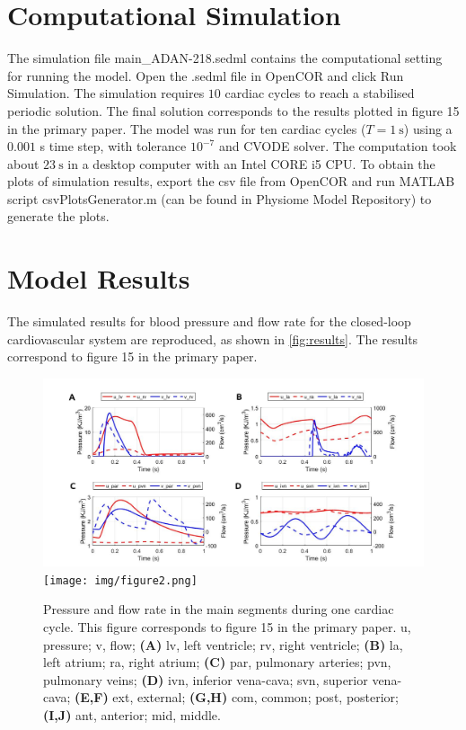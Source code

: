 \documentclass[fleqn,10pt]{physiome}
\begin{document}
\section{Computational Simulation} 

The simulation file main\_ADAN-218.sedml contains the computational setting for running the model. Open the .sedml file in OpenCOR and click Run Simulation. The simulation requires $10$ cardiac cycles to reach a stabilised periodic solution. The final solution corresponds to the results plotted in figure 15 in the primary paper. The model was run for ten cardiac cycles ($T = 1~\mathrm{s}$) using a $0.001$ s time step, with tolerance $10^{-7}$ and CVODE solver. The computation took about $23~\mathrm{s}$ in a desktop computer with an Intel CORE i5 CPU. To obtain the plots of simulation results, export the csv file from OpenCOR and run MATLAB script csvPlotsGenerator.m (can be found in Physiome Model Repository) to generate the plots.

\section{Model Results}
The simulated results for blood pressure and flow rate for the closed-loop cardiovascular system are reproduced, as shown in \autoref{fig:results}. The results correspond to figure 15 in the primary paper.

\begin{figure}[ht!]
    \includegraphics[scale=1.45]{img/figure1.png}
    \texttt{[image: img/figure2.png]}
    \caption{Pressure and flow rate in the main segments during one cardiac cycle. This figure corresponds to figure 15 in the primary paper. u, pressure; v, flow; \textbf{(A)} lv, left ventricle; rv, right ventricle; \textbf{(B)} la, left atrium; ra, right atrium; \textbf{(C)} par, pulmonary arteries; pvn, pulmonary veins; \textbf{(D)} ivn, inferior vena-cava; svn, superior vena-cava; \textbf{(E,F)} ext, external; \textbf{(G,H)} com, common; post, posterior; \textbf{(I,J)} ant, anterior; mid, middle.}
    \label{fig:results}
\end{figure}
\end{document}
